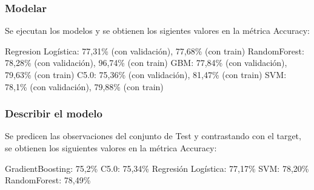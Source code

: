\subsubsection{Modelar}

Se ejecutan los modelos y se obtienen los sigientes valores en la métrica Accuracy:

Regresion Logística: 77,31\% (con validación), 77,68\% (con train)
RandomForest: 78,28\% (con validación), 96,74\% (con train)
GBM: 77,84\% (con validación), 79,63\% (con train)
C5.0: 75,36\% (con validación), 81,47\% (con train)
SVM: 78,1\% (con validación), 79,88\% (con train)

\subsubsection{Describir el modelo}

Se predicen las observaciones del conjunto de Test y contrastando con el target, se obtienen los siguientes valores en la métrica Accuracy:

GradientBoosting: 75,2\%
C5.0: 75,34\%
Regresión Logística: 77,17\%
SVM: 78,20\%
RandomForest: 78,49\%


%
%
%
%
